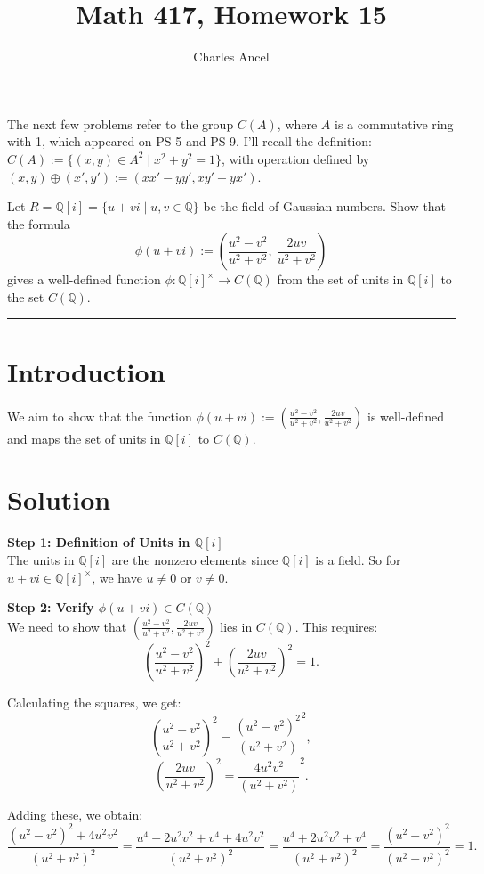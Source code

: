\documentclass[12pt]{amsart}
\title{Math 417, Homework 15}
\author{Charles Ancel}
\theoremstyle{definition}
\numberwithin{equation}{section}
\newcommand{\Q}{\mathbb{Q}}
\begin{document}
\maketitle

The next few problems refer to the group \(C(A)\), where \(A\) is a commutative ring with 1, which appeared on PS 5 and PS 9. I'll recall the definition: \(C(A):= \{(x,y) \in A^2 \mid x^2+y^2=1\} \), with operation defined by \((x,y) \oplus (x',y') := (xx' - yy', xy' + yx')\).

\begin{exercise}{1} Let \(R=\Q[i]=\{u + vi \mid u,v \in \Q \} \) be the field of Gaussian numbers. Show that the formula \[\phi(u+vi) := \left(\frac{u^2-v^2}{u^2+v^2}, \ \frac{2uv}{u^2+v^2}\right)\] gives a well-defined function \(\phi: \Q{[i]}^{\times} \rightarrow C(\Q) \) from the set of units in \(\Q[i]\) to the set \(C(\Q)\).

    \noindent\rule{\linewidth}{1pt}

    \section*{Introduction}
    We aim to show that the function \(\phi(u+vi) := \left(\frac{u^2-v^2}{u^2+v^2}, \frac{2uv}{u^2+v^2}\right)\) is well-defined and maps the set of units in \(\Q[i]\) to \(C(\Q)\).

    \section*{Solution}
    \noindent \textbf{Step 1: Definition of Units in \(\Q[i]\)}\\
    The units in \(\Q[i]\) are the nonzero elements since \(\Q[i]\) is a field. So for \(u + vi \in \Q{[i]}^{\times}\), we have \(u \neq 0\) or \(v \neq 0\).

    \noindent \textbf{Step 2: Verify \(\phi(u+vi) \in C(\Q)\)}\\
    We need to show that \(\left(\frac{u^2-v^2}{u^2+v^2}, \frac{2uv}{u^2+v^2}\right)\) lies in \(C(\Q)\). This requires:
    \[
    {\left(\frac{u^2-v^2}{u^2+v^2}\right)}^2 + {\left(\frac{2uv}{u^2+v^2}\right)}^2 = 1.
    \]

    Calculating the squares, we get:
    \[
    {\left(\frac{u^2-v^2}{u^2+v^2}\right)}^2 = {\frac{{(u^2-v^2)}^2}{(u^2+v^2)}^2},
    \]
    \[
    {\left(\frac{2uv}{u^2+v^2}\right)}^2 = {\frac{4u^2v^2}{(u^2+v^2)}^2}.
    \]

    Adding these, we obtain:
    \[
    \frac{{(u^2-v^2)}^2 + 4u^2v^2}{{(u^2+v^2)}^2} = \frac{u^4 - 2u^2v^2 + v^4 + 4u^2v^2}{{(u^2+v^2)}^2} = \frac{u^4 + 2u^2v^2 + v^4}{{(u^2+v^2)}^2} = \frac{{(u^2+v^2)}^2}{{(u^2+v^2)}^2} = 1.
    \]


\end{exercise}
\end{document}
